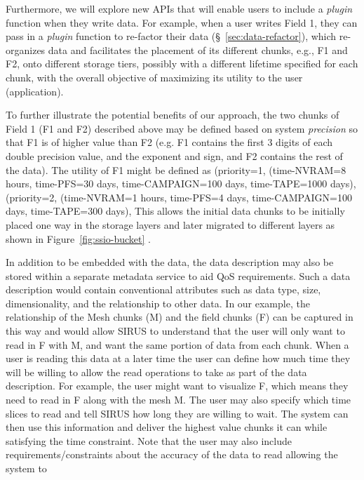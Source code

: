 Furthermore, we will explore new APIs that will enable users to include a {\it plugin} function when 
they write data. For example, when a user writes Field 1, they can pass in a {\it plugin} function 
to re-factor their data (\S~\ref{sec:data-refactor}), which re-organizes data and facilitates the 
placement of its different chunks, e.g., F1 and F2,  onto different storage tiers, possibly with 
a different lifetime specified for each chunk, with the overall objective of maximizing its 
utility to the user (application).

To further illustrate the potential benefits of our approach, the two chunks of Field 1 (F1 and F2) 
described above may be defined based on system {\it precision} so that F1 is of higher value 
than F2 (e.g. F1 contains the first 3 digits of each double precision value, and the exponent and 
sign, and F2 contains the rest of the data). 
%
The utility of F1 might be defined as (priority=1, (time-NVRAM=8 hours, time-PFS=30 days, time-CAMPAIGN=100 days, time-TAPE=1000 days), 
(priority=2, (time-NVRAM=1 hours, time-PFS=4 days, time-CAMPAIGN=100 days, time-TAPE=300 days), 
This allows the initial data chunks to be initially 
placed one way in the storage layers and later migrated to different layers as shown in 
Figure~\ref{fig:ssio-bucket} .
 
In addition to be embedded with the data, the data description may also be stored within 
a separate metadata service to aid QoS requirements. Such a data description would contain
conventional attributes such as data type, size, dimensionality, and the relationship to other 
data. In our example, the relationship of the Mesh chunks (M) and the field chunks (F) can 
be captured in this way and would allow SIRUS to understand that the user will only 
want to read in F with M, and want the same portion of data from each chunk. 
%
When a user is reading this data at a later time the user can define how much time they will 
be willing to allow the read operations to take as part of the data description. For example, 
the user might want to visualize F, which means they need to read in F along with the mesh 
M. The user may also specify which time slices to read and tell SIRUS how long they 
are willing to wait. The system can then use this information and deliver the highest value 
chunks it can while satisfying the time constraint.  Note that the user may also include 
requirements/constraints about the accuracy of the data to read allowing the system to 


